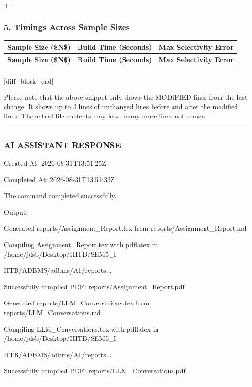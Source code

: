 \documentclass[11pt,a4paper]{article}
\begin{document}
+

\subsubsection{5. Timings Across Sample Sizes}
{\begingroup
\small
\setlength{\tabcolsep}{5pt}
\begin{xltabular}{\textwidth}{l | C | C}
\toprule
\textbf{Sample Size (\$N\$)} & \textbf{Build Time (Seconds)} & \textbf{Max Selectivity Error} \\
\midrule
\endfirsthead
\toprule
\textbf{Sample Size (\$N\$)} & \textbf{Build Time (Seconds)} & \textbf{Max Selectivity Error} \\
\midrule
\endfirsthead
\endhead
\bottomrule
\endfoot
\bottomrule
\endlastfoot
\end{xltabular}
\endgroup}

[diff\_block\_end]


Please note that the above snippet only shows the MODIFIED lines from the last change. It shows up to 3 lines of unchanged lines before and after the modified lines. The actual file contents may have many more lines not shown.


\hrule

\subsubsection{AI ASSISTANT RESPONSE}

Created At: 2026-08-31T13:51:25Z

Completed At: 2026-08-31T13:51:33Z


The command completed successfully.

Output:

Generated reports/Assignment\_Report.tex from reports/Assignment\_Report.md

Compiling Assignment\_Report.tex with pdflatex in /home/jdsb/Desktop/IIITB/SEM5\_I

IITB/ADBMS/adbms/A1/reports...

Successfully compiled PDF: reports/Assignment\_Report.pdf

Generated reports/LLM\_Conversations.tex from reports/LLM\_Conversations.md

Compiling LLM\_Conversations.tex with pdflatex in /home/jdsb/Desktop/IIITB/SEM5\_I

IITB/ADBMS/adbms/A1/reports...

Successfully compiled PDF: reports/LLM\_Conversations.pdf


\hrule
\end{document}
